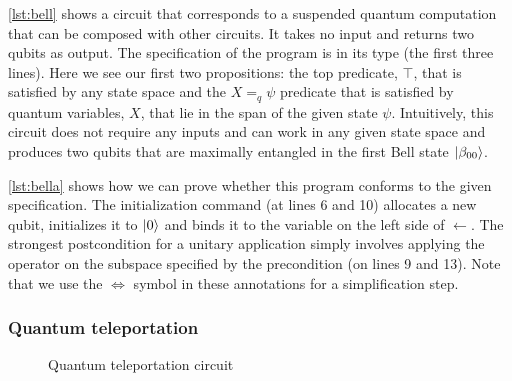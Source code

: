 \documentclass[adraft,creativecommons]{eptcs}
\theoremstyle{definition}
\theoremstyle{remark}
\begin{document}


\cref{lst:bell} shows a circuit that corresponds to a suspended quantum computation that can be composed with other circuits. It takes no input and returns two qubits as output. The specification of the program is in its type (the first three lines). Here we see our first two propositions: the top predicate, $\top$, that is satisfied by any state space and the $X =_q \psi$ predicate that is satisfied by quantum variables, $X$, that lie in the span of the given state $\psi$. Intuitively, this circuit does not require any inputs and can work in any given state space and produces two qubits that are maximally entangled in the first Bell state $\ket{\beta_{00}}$.



\cref{lst:bella} shows how we can prove whether this program conforms to the given specification. The initialization command (at lines 6 and 10) allocates a new qubit, initializes it to $\ket{0}$ and binds it to the variable on the left side of $\leftarrow$. The strongest postcondition for a unitary application simply involves applying the operator on the subspace specified by the precondition (on lines 9 and 13). Note that we use the $\Leftrightarrow$ symbol in these annotations for a simplification step.

\subsubsection{Quantum teleportation}
\label{sec:teleport}

\begin{figure}
    \centering
    \caption{Quantum teleportation circuit}
    \label{fig:teleport}
\end{figure}
\end{document}
